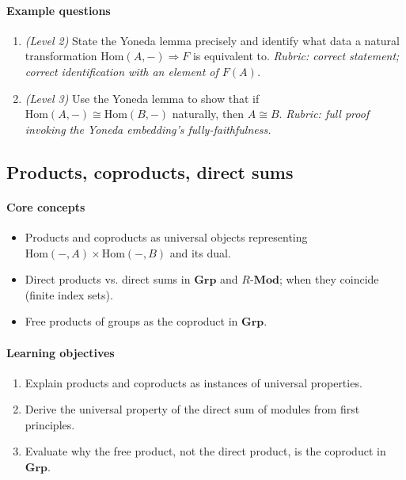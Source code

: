 \documentclass{article}
\begin{document}
\paragraph{Example questions}
\begin{enumerate}[nosep]
  \item \emph{(Level 2)} State the Yoneda lemma precisely and identify what data a natural transformation $\mathrm{Hom}(A,-) \Rightarrow F$ is equivalent to. \emph{Rubric: correct statement; correct identification with an element of $F(A)$.}
  \item \emph{(Level 3)} Use the Yoneda lemma to show that if $\mathrm{Hom}(A,-) \cong \mathrm{Hom}(B,-)$ naturally, then $A \cong B$. \emph{Rubric: full proof invoking the Yoneda embedding's fully-faithfulness.}
\end{enumerate}

\subsection{Products, coproducts, direct sums}
\paragraph{Core concepts}
\begin{itemize}[nosep]
  \item Products and coproducts as universal objects representing $\mathrm{Hom}(-,A)\times\mathrm{Hom}(-,B)$ and its dual.
  \item Direct products vs. direct sums in $\mathbf{Grp}$ and $R\text{-}\mathbf{Mod}$; when they coincide (finite index sets).
  \item Free products of groups as the coproduct in $\mathbf{Grp}$.
\end{itemize}
\paragraph{Learning objectives}
\begin{enumerate}[nosep]
  \item Explain products and coproducts as instances of universal properties.
  \item Derive the universal property of the direct sum of modules from first principles.
  \item Evaluate why the free product, not the direct product, is the coproduct in $\mathbf{Grp}$.
\end{enumerate}
\end{document}
